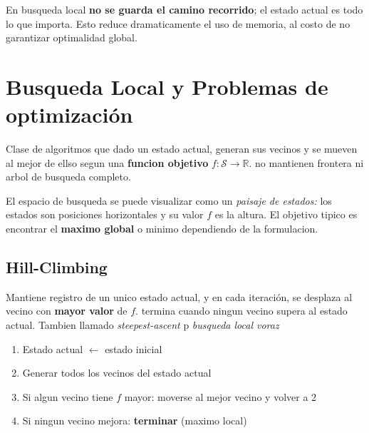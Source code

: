 En busqueda local \textbf{no se guarda el camino recorrido}; el estado actual es todo lo que importa. Esto reduce dramaticamente el uso de memoria, al costo
de no garantizar optimalidad global.

\section{Busqueda Local y Problemas de optimización}
\begin{definition}
    Clase de algoritmos que dado un estado actual, generan sus vecinos y se mueven al mejor de ellso segun una \textbf{funcion objetivo}
    $f: \mathcal{S} \to \mathbb{R}$. no mantienen frontera ni arbol de busqueda completo.
\end{definition}

El espacio de busqueda se puede visualizar como un \emph{paisaje de estados:} los estados son posiciones horizontales y su valor $f$ es la altura. El objetivo tipico
es encontrar el \textbf{maximo global} o minimo dependiendo de la formulacion.

\subsection{Hill-Climbing}
\begin{definition}
    Mantiene registro de un unico estado actual, y en cada iteración, se desplaza al vecino con \textbf{mayor valor} de $f$. termina cuando ningun vecino supera al estado actual. 
    Tambien llamado \emph{steepest-ascent} p \emph{busqueda local voraz}
\end{definition}

\begin{example}
    \begin{enumerate}
        \item Estado actual $\leftarrow$ estado inicial
        \item Generar todos los vecinos del estado actual
        \item Si algun vecino tiene $f$ mayor: moverse al mejor vecino y volver a 2
        \item Si ningun vecino mejora: \textbf{terminar} (maximo local)
    \end{enumerate}
\end{example}

